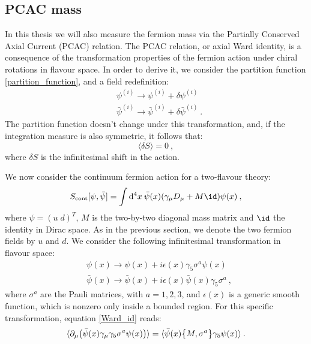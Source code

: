 \subsection{PCAC mass}
\label{measure_PCAC}

In this thesis we will also measure the fermion mass via the Partially Conserved Axial Current (PCAC) relation.
The PCAC relation, or axial Ward identity, is a consequence of the transformation properties of the fermion action under chiral rotations in flavour space. In order to derive it, we consider the partition function \ref{partition_function}, and a field redefinition:
\begin{equation}
\begin{split}
& \psi^{(i)} \to \psi^{(i)} + \delta \psi^{(i)} \\
& \bar \psi^{(i)} \to \bar \psi^{(i)} +  \delta \bar\psi^{(i)} \: .
\end{split}
\end{equation}
%
The partition function doesn't change under this transformation, and, if the integration measure is also symmetric, it follows that:
\begin{equation}
\langle \delta S \rangle = 0 \: ,
\label{Ward_id}
\end{equation}
%
where $\delta S$ is the infinitesimal shift in the action.

We now consider the continuum fermion action for a two-flavour theory:
\begin{equation}
S_{\mathrm{cont}}[\psi, \bar \psi] =  \int \dx  \: \bar \psi(x)(\gamma_{\mu} D_{\mu} + M \id) \psi(x) \: ,
\end{equation}
%
where $\psi = (u \; d)^T$, $M$ is the two-by-two diagonal mass matrix and $\id$ the identity in Dirac space. As in the previous section, we denote the two fermion fields by $u$ and $d$. We consider the following infinitesimal transformation in flavour space:
\begin{equation}
\begin{split}
& \psi(x) \to \psi(x) + i \epsilon(x) \gamma_5 \sigma^a \psi(x) \\
& \bar\psi(x) \to \bar\psi(x) + i \epsilon(x) \bar \psi(x) \gamma_5 \sigma^a \: ,
\end{split}
\end{equation}
%
where $\sigma^a$ are the Pauli matrices, with $a=1,2,3$, and $\epsilon(x)$ is a generic smooth function, which is nonzero only inside a bounded region. For this specific transformation, equation \ref{Ward_id} reads:
\begin{equation}
\langle \partial_{\mu} \bigl(\bar \psi(x) \gamma_{\mu} \gamma_5 \sigma^a \psi(x)\bigr) \rangle = \langle \bar\psi(x) \qty \big{M,\sigma^a} \gamma_5 \psi(x) \rangle \: .
\label{axial_WI_general}
\end{equation}

